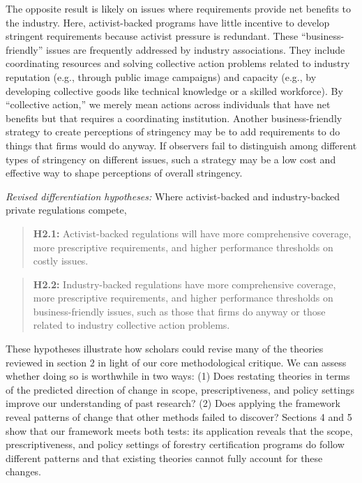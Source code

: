 \documentclass[
      12pt,
            Review ]{article}
\begin{document}
The opposite result is likely on issues where requirements provide net
benefits to the industry. Here, activist-backed programs have little
incentive to develop stringent requirements because activist pressure is
redundant. These ``business-friendly'' issues are frequently addressed
by industry associations. They include coordinating resources and
solving collective action problems related to industry reputation (e.g.,
through public image campaigns) and capacity (e.g., by developing
collective goods like technical knowledge or a skilled workforce). By
``collective action,'' we merely mean actions across individuals that
have net benefits but that requires a coordinating institution. Another
business-friendly strategy to create perceptions of stringency may be to
add requirements to do things that firms would do anyway. If observers
fail to distinguish among different types of stringency on different
issues, such a strategy may be a low cost and effective way to shape
perceptions of overall stringency.

\emph{Revised differentiation hypotheses:} Where activist-backed and
industry-backed private regulations compete,

\begin{quote}
\textbf{H2.1:} Activist-backed regulations will have more comprehensive
coverage, more prescriptive requirements, and higher performance
thresholds on costly issues.
\end{quote}

\begin{quote}
\textbf{H2.2:} Industry-backed regulations have more comprehensive
coverage, more prescriptive requirements, and higher performance
thresholds on business-friendly issues, such as those that firms do
anyway or those related to industry collective action problems.
\end{quote}

These hypotheses illustrate how scholars could revise many of the
theories reviewed in section 2 in light of our core methodological
critique. We can assess whether doing so is worthwhile in two ways: (1)
Does restating theories in terms of the predicted direction of change in
scope, prescriptiveness, and policy settings improve our understanding
of past research? (2) Does applying the framework reveal patterns of
change that other methods failed to discover? Sections 4 and 5 show that
our framework meets both tests: its application reveals that the scope,
prescriptiveness, and policy settings of forestry certification programs
do follow different patterns and that existing theories cannot fully
account for these changes.
\end{document}

